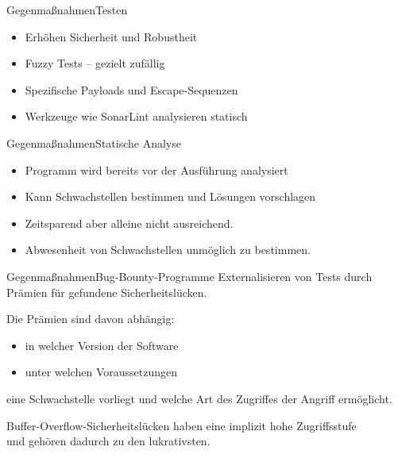 \begin{frame}{Gegenmaßnahmen}{Testen}
    \begin{itemize}
        \item Erhöhen Sicherheit und Robustheit
        \item Fuzzy Tests -- gezielt zufällig
        \item Spezifische Payloads und Escape-Sequenzen
        \item Werkzeuge wie SonarLint analysieren statisch%
    \end{itemize}    
\end{frame}


\begin{frame}{Gegenmaßnahmen}{Statische Analyse}

\begin{itemize}
    \item Programm wird bereits vor der Ausführung analysiert 
    \item Kann Schwachstellen bestimmen und Lösungen vorschlagen
    \item Zeitsparend aber alleine nicht ausreichend.
    \item Abwesenheit von Schwachstellen unmöglich zu bestimmen.    
\end{itemize}

\end{frame}


\begin{frame}{Gegenmaßnahmen}{Bug-Bounty-Programme} 
    Externalisieren von Tests durch Prämien für gefundene Sicherheitslücken.

    \vspace{1em}
    Die Prämien sind davon abhängig:
    \begin{itemize}
        \item in welcher Version der Software
        \item unter welchen Voraussetzungen
    \end{itemize}

    eine Schwachstelle vorliegt und welche Art des Zugriffes der Angriff ermöglicht.

    \vspace{1em}
    Buffer-Overflow-Sicherheitslücken haben eine implizit hohe Zugriffsstufe \\
    und gehören dadurch zu den lukrativsten.
    

\end{frame}


